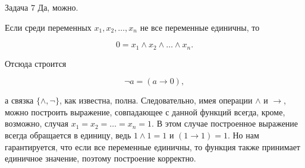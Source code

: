 \documentclass{article}
\begin{document}
	\begin{section}{Задача 7}
		Да, можно.

		Если среди переменных $x_1, x_2, \dots, x_n$ не все переменные единичны, то

		\begin{equation*}
			0 = x_1 \land x_2 \land \dots \land x_n.
		\end{equation*}

		Отсюда строится

		\begin{equation*}
			\neg a = (a \rightarrow 0),
		\end{equation*}

		а связка $\{\land, \neg\}$, как известна, полна. Следовательно, имея операции $\land$ и $\rightarrow$, можно построить выражение, совпадающее с данной функций всегда, кроме, возможно, случая $x_1 = x_2 = \dots = x_n = 1$. В этом случае построенное выражение всегда обращается в единицу, ведь $1 \land 1 = 1$ и $(1 \rightarrow 1) = 1$. Но нам гарантируется, что если все переменные единичны, то функция также принимает единичное значение, поэтому построение корректно.
	\end{section}
\end{document}
